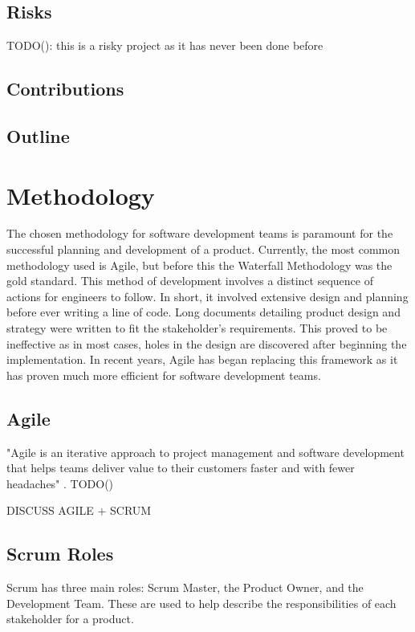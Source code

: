 \documentclass{article}
\begin{document}
\subsection{Risks}
TODO(): this is a risky project as it has never been done before 

\subsection{Contributions}



\subsection{Outline}



\section{Methodology}
The chosen methodology for software development teams is paramount for the successful planning and development of a product. Currently, the most common methodology used is Agile, but before this the Waterfall Methodology was the gold standard. This method of development involves a distinct sequence of actions for engineers to follow. In short, it involved extensive design and planning before ever writing a line of code. Long documents detailing product design and strategy were written to fit the stakeholder's requirements. This proved to be ineffective as in most cases, holes in the design are discovered after beginning the implementation. In recent years, Agile has began replacing this framework as it has proven much more efficient for software development teams.



\subsection{Agile}
"Agile is an iterative approach to project management and software development that helps teams deliver value to their customers faster and with fewer headaches" \cite{what-is-agile}. TODO()


DISCUSS AGILE + SCRUM

\subsection{Scrum Roles}
Scrum has three main roles: Scrum Master, the Product Owner, and the Development Team. These are used to help describe the responsibilities of each stakeholder for a product.
\end{document}

